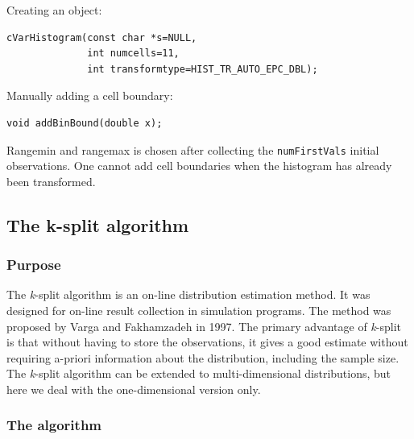 Creating an object:

\begin{verbatim}
cVarHistogram(const char *s=NULL,
              int numcells=11,
              int transformtype=HIST_TR_AUTO_EPC_DBL);
\end{verbatim}

Manually adding a cell boundary:

\begin{verbatim}
void addBinBound(double x);
\end{verbatim}

Rangemin and rangemax is chosen after collecting the
\texttt{numFirstVals} initial observations. One cannot add cell
boundaries when the histogram has already been transformed.





\subsection{The k-split algorithm}

\subsubsection{Purpose}


The \textit{k}-split algorithm is an on-line distribution
estimation method.  It was
designed for on-line result collection in simulation programs.  The
method was proposed by Varga and Fakhamzadeh in 1997. The primary
advantage of \textit{k}-split is that without having to store the
observations, it gives a good estimate without requiring a-priori
information about the distribution, including the sample size. The
\textit{k}-split algorithm can be extended to multi-dimensional
distributions, but here we deal
with the one-dimensional version only.


\subsubsection{The algorithm}



